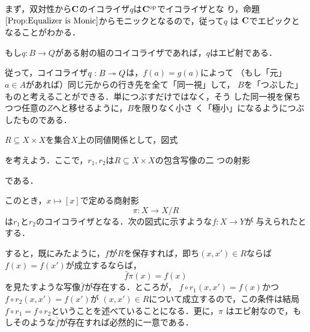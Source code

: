 まず，双対性から${\bf C}$のイコライザ$q$は${\bf C}^{\mathrm{op}}$でイコライザとな
り，命題$\ref{Prop:Equalizer is Monic}$からモニックとなるので，従って$q$
は ${\bf C}$でエピックとなることがわかる．

\begin{prop}
 もし$q: B \to Q$がある射の組のコイコライザであれば，$q$はエピ射である．
\end{prop}

従って，コイコライザ$q: B \twoheadrightarrow Q$は，$f(a) = g(a)$によって
（もし「元」$a \in A$があれば）同じ元からの行き先を全て「同一視」して，
$B$を「つぶした」ものと考えることができる．単につぶすだけではなく，そう
した同一視を保ちつつ任意の$Z$へと移せるように，$B$を限りなく小さ
く「極小」になるようにつぶしたものである．

\begin{example}
 $R \subseteq X \times X$を集合$X$上の同値関係として，図式
 \begin{center}
 \end{center}
 を考えよう．ここで，$r_1, r_2$は$R \subseteq X \times X$の包含写像の二
 つの射影
 \begin{center}
 \end{center}
 である．

 このとき，$x \mapsto [x]$で定める商射影
 \[
  \pi: X \to X/R
 \]
 は$r_1$と$r_2$のコイコライザとなる．次の図式に示すような$f: X \to Y$が
 与えられたとする．
 \begin{center}
 \end{center}
 すると，既にみたように，$f$が$R$を保存すれば，即ち$(x, x') \in R$ならば
 $f(x) = f(x')$が成立するならば，
 \[
  \bar{f}\pi(x) = f(x)
 \]
 を見たすような写像$\bar{f}$が存在する．ところが，
 $f \circ r_1(x, x') = f(x)$かつ$f \circ r_2(x,x') = f(x')$が
 $(x, x') \in R$について成立するので，この条件は結局
 $f\circ r_1 = f \circ r_2$ということを述べていることになる．更に，$\pi$
 はエピ射なので，もしそのような$\bar{f}$が存在すれば必然的に一意である．


\end{example}
